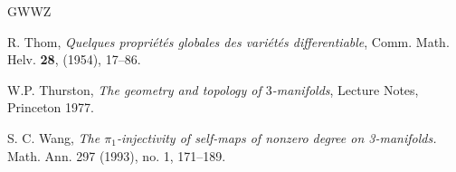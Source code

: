 \documentclass{amsart}
\begin{document}
\begin{thebibliography}{GWWZ}

R. Thom, {\em Quelques propri\'et\'es globales des vari\'et\'es differentiable}, Comm. Math. Helv. {\bf 28}, (1954), 17--86.


 {\sc W.P. Thurston},
{\it The geometry and topology of $3$-manifolds}, Lecture Notes, Princeton 1977.

 S. C. Wang, {\it The  $\pi_1$-injectivity of self-maps of nonzero degree on  3-manifolds.}
Math. Ann. 297 (1993), no. 1, 171--189.










\end{thebibliography}
\end{document}
